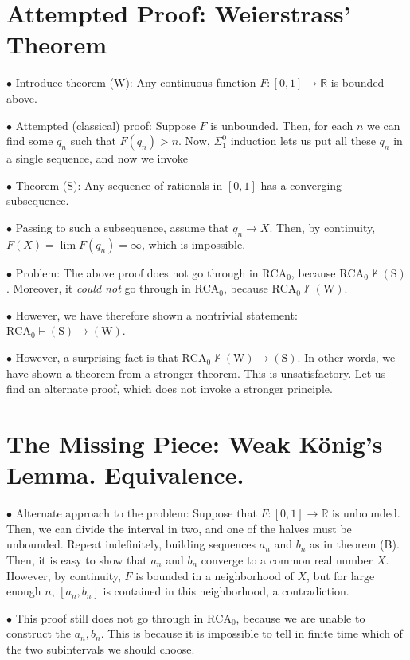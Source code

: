 \documentclass{article}
\theoremstyle{nonumberplain}
\newcommand{\R}{\mathbb{R}}
\newcommand{\RCA}{\mathrm{RCA}}
\newcommand\point[1]{\noindent \hspace{\labelsep} $\bullet$ #1 \smallskip}
\newcommand\thname[1]{\mathrm{(#1)}}
\begin{document}
\section{Attempted Proof: Weierstrass' Theorem}

\point{Introduce theorem (W): Any continuous function $F \colon [0,1] \to \R$ is bounded above.}

\point{Attempted (classical) proof: Suppose $F$ is unbounded. Then, for each $n$ we can find some $q_n$ such that $F(q_n) > n$. Now, $\Sigma^0_1$ induction lets us put all these $q_n$ in a single sequence, and now we invoke}

\point{Theorem (S): Any sequence of rationals in $[0,1]$ has a converging subsequence.}

\point{Passing to such a subsequence, assume that $q_n \to X$. Then, by continuity, $F(X) = \lim F(q_n) = \infty$, which is impossible.}

\point{Problem: The above proof does not go through in $\RCA_0$, because $\RCA_0 \nvdash \thname{S}$. Moreover, it \emph{could not} go through in $\RCA_0$, because $\RCA_0 \nvdash \thname{W}$.}

\point{However, we have therefore shown a nontrivial statement: $\RCA_0 \vdash \thname S \rightarrow \thname W$.}

\point{However, a surprising fact is that $\RCA_0 \nvdash \thname W \rightarrow \thname S$. In other words, we have shown a theorem from a stronger theorem. This is unsatisfactory. Let us find an alternate proof, which does not invoke a stronger principle.}

\section{The Missing Piece: Weak König's Lemma. Equivalence.}

\point{Alternate approach to the problem: Suppose that $F \colon [0,1] \to \R$ is unbounded. Then, we can divide the interval in two, and one of the halves must be unbounded. Repeat indefinitely, building sequences $a_n$ and $b_n$ as in theorem (B). Then, it is easy to show that $a_n$ and $b_n$ converge to a common real number $X$. However, by continuity, $F$ is bounded in a neighborhood of $X$, but for large enough $n$, $[a_n, b_n]$ is contained in this neighborhood, a contradiction.}

\point{This proof still does not go through in $\RCA_0$, because we are unable to construct the $a_n, b_n$. This is because it is impossible to tell in finite time which of the two subintervals we should choose.}
\end{document}
